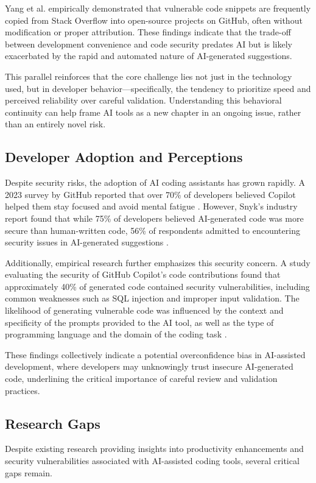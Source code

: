 Yang et al. \cite{yang2017code} empirically demonstrated that vulnerable code snippets are frequently copied from Stack Overflow into open-source projects on GitHub, often without modification or proper attribution. These findings indicate that the trade-off between development convenience and code security predates AI but is likely exacerbated by the rapid and automated nature of AI-generated suggestions.

This parallel reinforces that the core challenge lies not just in the technology used, but in developer behavior—specifically, the tendency to prioritize speed and perceived reliability over careful validation. Understanding this behavioral continuity can help frame AI tools as a new chapter in an ongoing issue, rather than an entirely novel risk.


\subsection{Developer Adoption and Perceptions}
Despite security risks, the adoption of AI coding assistants has grown rapidly. A 2023 survey by GitHub reported that over 70\% of developers believed Copilot helped them stay focused and avoid mental fatigue \cite{githubSurvey}. However, Snyk’s industry report found that while 75\% of developers believed AI-generated code was more secure than human-written code, 56\% of respondents admitted to encountering security issues in AI-generated suggestions \cite{snyk2023}.

Additionally, empirical research further emphasizes this security concern. A study evaluating the security of GitHub Copilot’s code contributions found that approximately 40\% of generated code contained security vulnerabilities, including common weaknesses such as SQL injection and improper input validation. The likelihood of generating vulnerable code was influenced by the context and specificity of the prompts provided to the AI tool, as well as the type of programming language and the domain of the coding task \cite{pearce2021asleep}.

These findings collectively indicate a potential overconfidence bias in AI-assisted development, where developers may unknowingly trust insecure AI-generated code, underlining the critical importance of careful review and validation practices.

\subsection{Research Gaps}
Despite existing research providing insights into productivity enhancements and security vulnerabilities associated with AI-assisted coding tools, several critical gaps remain.

